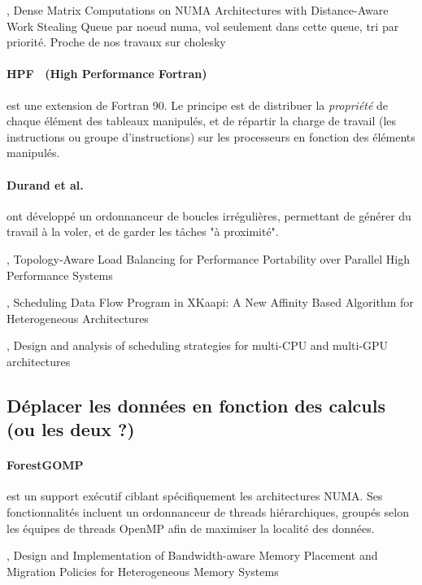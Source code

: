 \cite{Al-Omairy2015}, Dense Matrix Computations on NUMA Architectures with Distance-Aware Work Stealing
Queue par noeud numa, vol seulement dans cette queue, tri par priorité.
Proche de nos travaux sur cholesky


\paragraph{HPF~\cite{HPF} (High Performance Fortran)} est une extension de Fortran 90.
Le principe est de distribuer la \emph{propriété} de chaque élément des tableaux manipulés, et de répartir la charge de travail (les instructions ou groupe d'instructions) sur les processeurs en fonction des éléments manipulés.


\paragraph{Durand et al.~\cite{Durand2013}} ont développé un ordonnanceur de boucles irrégulières, permettant de générer du travail à la voler, et de garder les tâches "à proximité".


\cite{Pilla2014}, Topology-Aware Load Balancing for Performance Portability over Parallel High Performance Systems


\cite{Bleuse2014}, Scheduling Data Flow Program in XKaapi: A New Affinity Based Algorithm for Heterogeneous Architectures

\cite{Lima2015}, Design and analysis of scheduling strategies for multi-CPU and multi-GPU architectures

\subsection{Déplacer les données en fonction des calculs (ou les deux ?)}

\paragraph{ForestGOMP~\cite{Broquedis2010a}} est un support exécutif ciblant spécifiquement les architectures NUMA.
Ses fonctionnalités incluent un ordonnanceur de threads hiérarchiques, groupés selon les équipes de threads OpenMP afin de maximiser la localité des données.

\cite{Yu2017}, Design and Implementation of Bandwidth-aware Memory Placement and Migration Policies for Heterogeneous Memory Systems



